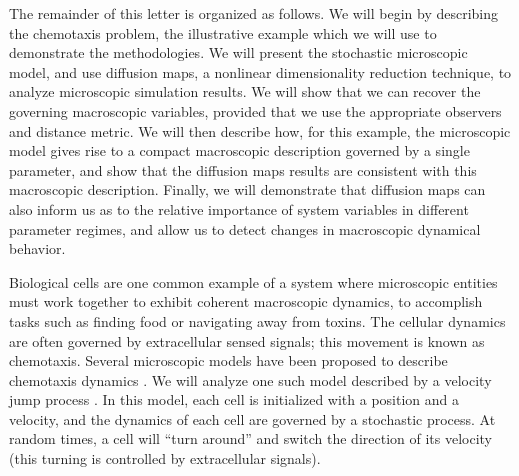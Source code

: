 \documentclass[prl, reprint, final, showkeys]{revtex4-1}
\begin{document}
The remainder of this letter is organized as follows. 
%
We will begin by describing the chemotaxis problem, the illustrative example which we will use to demonstrate the methodologies.
%
We will present the stochastic microscopic model, and use diffusion maps, a nonlinear dimensionality reduction technique, to analyze microscopic simulation results.
%
We will show that we can recover the governing macroscopic variables, provided that we use the appropriate observers and distance metric.
%
We will then describe how, for this example, the microscopic model gives rise to a compact macroscopic description governed by a single parameter, and show that the diffusion maps results are consistent with this macroscopic description. 
%
Finally, we will demonstrate that diffusion maps can also inform us as to the relative importance of system variables in different parameter regimes, and allow us to detect changes in macroscopic dynamical behavior.



Biological cells are one common example of a system where microscopic entities must work together to exhibit coherent macroscopic dynamics, to accomplish tasks such as finding food or navigating away from toxins.
%
The cellular dynamics are often governed by extracellular sensed signals; this movement is known as chemotaxis. 
%
Several microscopic models have been proposed to describe chemotaxis dynamics \cite{othmer1988models, codling2008random}.
%
We will analyze one such model described by a velocity jump process \cite{othmer2000diffusion}.
%
In this model, each cell is initialized with a position and a velocity, and the dynamics of each cell are governed by a stochastic process.
%
At random times, a cell will ``turn around'' and switch the direction of its velocity (this turning is controlled by extracellular signals). 
%

\end{document}
